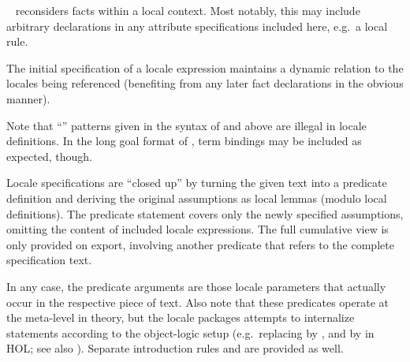 \begin{isabellebody}
\begin{isamarkuptext}
\begin{description}
\begin{description}
  \item \hyperlink{element.notes}{\mbox{}}~
  reconsiders facts within a local context.  Most notably, this may
  include arbitrary declarations in any attribute specifications
  included here, e.g.\ a local \hyperlink{attribute.simp}{\mbox{}} rule.

  The initial  specification of a locale expression
  maintains a dynamic relation to the locales being referenced
  (benefiting from any later fact declarations in the obvious manner).

  \end{description}
  
  Note that ``'' patterns given
  in the syntax of \hyperlink{element.assumes}{\mbox{}} and \hyperlink{element.defines}{\mbox{}} above
  are illegal in locale definitions.  In the long goal format of
  , term bindings may be included as expected,
  though.
  
  \medskip Locale specifications are ``closed up'' by
  turning the given text into a predicate definition  and deriving the original assumptions as local lemmas
  (modulo local definitions).  The predicate statement covers only the
  newly specified assumptions, omitting the content of included locale
  expressions.  The full cumulative view is only provided on export,
  involving another predicate  that refers to the complete
  specification text.
  
  In any case, the predicate arguments are those locale parameters
  that actually occur in the respective piece of text.  Also note that
  these predicates operate at the meta-level in theory, but the locale
  packages attempts to internalize statements according to the
  object-logic setup (e.g.\ replacing  by , and
   by  in HOL; see also
  ).  Separate introduction rules  and  are provided as well.
  

\end{description}
\end{isamarkuptext}
\end{isabellebody}
